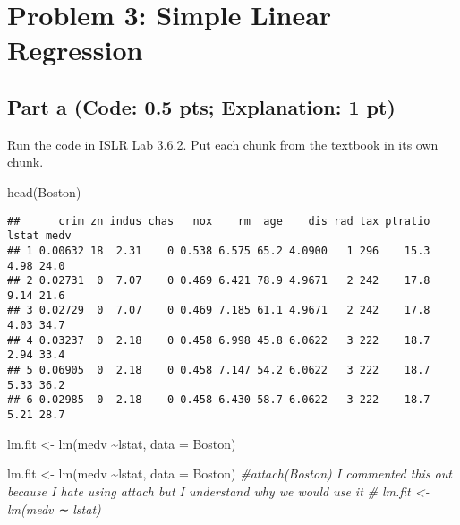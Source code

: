 \documentclass[
]{article}
\newenvironment{Shaded}{\begin{snugshade}}{\end{snugshade}}
\newcommand{\AttributeTok}[1]{\textcolor[rgb]{0.77,0.63,0.00}{#1}}
\newcommand{\CommentTok}[1]{\textcolor[rgb]{0.56,0.35,0.01}{\textit{#1}}}
\newcommand{\FunctionTok}[1]{\textcolor[rgb]{0.00,0.00,0.00}{#1}}
\newcommand{\NormalTok}[1]{#1}
\newcommand{\OtherTok}[1]{\textcolor[rgb]{0.56,0.35,0.01}{#1}}
\newcommand{\SpecialCharTok}[1]{\textcolor[rgb]{0.00,0.00,0.00}{#1}}
\begin{document}
\hypertarget{problem-3-simple-linear-regression}{%
\section{Problem 3: Simple Linear
Regression}\label{problem-3-simple-linear-regression}}

\hypertarget{part-a-code-0.5-pts-explanation-1-pt}{%
\subsection{Part a (Code: 0.5 pts; Explanation: 1
pt)}\label{part-a-code-0.5-pts-explanation-1-pt}}

Run the code in ISLR Lab 3.6.2. Put each chunk from the textbook in its
own chunk.

\begin{Shaded}
\begin{Highlighting}[]
\FunctionTok{head}\NormalTok{(Boston)}
\end{Highlighting}
\end{Shaded}

\begin{verbatim}
##      crim zn indus chas   nox    rm  age    dis rad tax ptratio lstat medv
## 1 0.00632 18  2.31    0 0.538 6.575 65.2 4.0900   1 296    15.3  4.98 24.0
## 2 0.02731  0  7.07    0 0.469 6.421 78.9 4.9671   2 242    17.8  9.14 21.6
## 3 0.02729  0  7.07    0 0.469 7.185 61.1 4.9671   2 242    17.8  4.03 34.7
## 4 0.03237  0  2.18    0 0.458 6.998 45.8 6.0622   3 222    18.7  2.94 33.4
## 5 0.06905  0  2.18    0 0.458 7.147 54.2 6.0622   3 222    18.7  5.33 36.2
## 6 0.02985  0  2.18    0 0.458 6.430 58.7 6.0622   3 222    18.7  5.21 28.7
\end{verbatim}

\begin{Shaded}
\begin{Highlighting}[]
\NormalTok{lm.fit }\OtherTok{\textless{}{-}} \FunctionTok{lm}\NormalTok{(medv }\SpecialCharTok{\textasciitilde{}}\NormalTok{lstat, }\AttributeTok{data =}\NormalTok{ Boston)}
\end{Highlighting}
\end{Shaded}

\begin{Shaded}
\begin{Highlighting}[]
\NormalTok{lm.fit }\OtherTok{\textless{}{-}} \FunctionTok{lm}\NormalTok{(medv }\SpecialCharTok{\textasciitilde{}}\NormalTok{lstat, }\AttributeTok{data =}\NormalTok{ Boston)}
\CommentTok{\#attach(Boston) I commented this out because I hate using attach but  I understand why we would use it}
\CommentTok{\# lm.fit \textless{}{-} lm(medv ∼ lstat)}
\end{Highlighting}
\end{Shaded}
\end{document}
